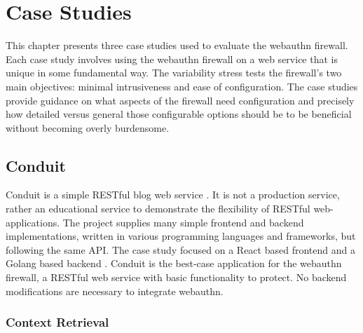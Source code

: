 
\chapter{Case Studies}\label{Chap:CaseStudies}

This chapter presents three case studies used to evaluate the webauthn firewall. Each case study involves using the webauthn firewall on a web service that is unique in some fundamental way. The variability stress tests the firewall's two main objectives: minimal intrusiveness and ease of configuration. The case studies provide guidance on what aspects of the firewall need configuration and precisely how detailed versus general those configurable options should be to be beneficial without becoming overly burdensome.

\section{Conduit}

Conduit is a simple RESTful blog web service \cite{TODO-conduit}. It is not a production service, rather an educational service to demonstrate the flexibility of RESTful web-applications. The project supplies many simple frontend and backend implementations, written in various programming languages and frameworks, but following the same API. The case study focused on a React based frontend \cite{TODO-Conduit-React-Frontend} and a Golang based backend \cite{TODO-Conduit-Go-Backend}. Conduit is the best-case application for the webauthn firewall, a RESTful web service with basic functionality to protect. No backend modifications are necessary to integrate webauthn.



\subsection{Context Retrieval}\label{Sec:Conduit_ContextRetrieval}

